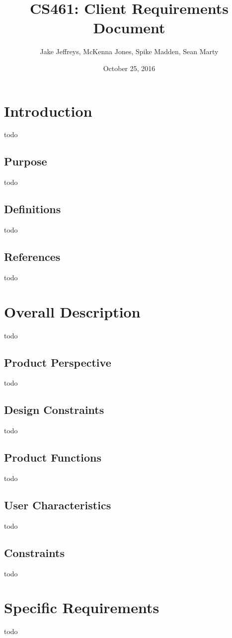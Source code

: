 \documentclass[10pt, oneside,onecolumn,draftclsnofoot]{IEEEtran}
\title{CS461: Client Requirements Document}
\author{Jake Jeffreys, McKenna Jones, Spike Madden, Sean Marty}
\date{October 25, 2016}
\begin{document}
\begin{titlepage}
\maketitle
\vspace{3cm}

\end{titlepage}

\tableofcontents
\section{Introduction}
todo
\subsection{Purpose}
todo
\subsection{Definitions}
todo
\subsection{References}
todo

\section{Overall Description}
todo
\subsection{Product Perspective}
todo
\subsection{Design Constraints}
todo
\subsection{Product Functions}
todo
\subsection{User Characteristics}
todo
\subsection{Constraints}
todo

\section{Specific Requirements}
todo
\end{document}
